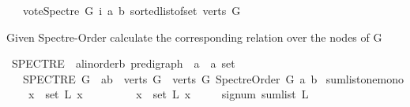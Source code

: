 \begin{isabellebody}
\ \ \ {\isacharparenleft}{\kern0pt}vote{\isacharunderscore}{\kern0pt}Spectre\ G\ i\ a\ b{\isacharparenright}{\kern0pt}{\isacharparenright}{\kern0pt}\ {\isacharparenleft}{\kern0pt}sorted{\isacharunderscore}{\kern0pt}list{\isacharunderscore}{\kern0pt}of{\isacharunderscore}{\kern0pt}set\ {\isacharparenleft}{\kern0pt}verts\ G{\isacharparenright}{\kern0pt}{\isacharparenright}{\kern0pt}{\isacharparenright}{\kern0pt}{\isacharparenright}{\kern0pt}{\isacharparenright}{\kern0pt}\ {\isacharequal}{\kern0pt}\ {}{\isacharparenright}{\kern0pt}{\isachardoublequoteclose}%
\begin{isamarkuptext}%
Given Spectre-Order calculate the corresponding relation over the nodes of G%
\end{isamarkuptext}\isamarkuptrue%
\isamarkupfalse%
\ SPECTRE\ {\isacharcolon}{\kern0pt}{\isacharcolon}{\kern0pt}\ {\isachardoublequoteopen}{\isacharparenleft}{\kern0pt}{\isacharprime}{\kern0pt}a{\isacharcolon}{\kern0pt}{\isacharcolon}{\kern0pt}linorder{\isacharcomma}{\kern0pt}{\isacharprime}{\kern0pt}b{\isacharparenright}{\kern0pt}\ pre{\isacharunderscore}{\kern0pt}digraph\ {\isasymRightarrow}\ {\isacharparenleft}{\kern0pt}{\isacharprime}{\kern0pt}a\ {\isasymtimes}\ {\isacharprime}{\kern0pt}a{\isacharparenright}{\kern0pt}\ set{\isachardoublequoteclose}\isanewline
\ \ \ {\isachardoublequoteopen}SPECTRE\ G\ {\isasymequiv}\ {\isacharbraceleft}{\kern0pt}{\isacharparenleft}{\kern0pt}a{\isacharcomma}{\kern0pt}b{\isacharparenright}{\kern0pt}\ {\isasymin}\ {\isacharparenleft}{\kern0pt}verts\ G\ {\isasymtimes}\ verts\ G{\isacharparenright}{\kern0pt}{\isachardot}{\kern0pt}\ Spectre{\isacharunderscore}{\kern0pt}Order\ G\ a\ b{\isacharbraceright}{\kern0pt}{\isachardoublequoteclose}%
\isadelimdocument
%
\endisadelimdocument
%
\isatagdocument
%
\isamarkuptrue%
%
\endisatagdocument
{\isafolddocument}%
%
\isadelimdocument
%
\endisadelimdocument
{}\isamarkupfalse%
\ sumlist{\isacharunderscore}{\kern0pt}one{\isacharunderscore}{\kern0pt}mono{\isacharcolon}{\kern0pt}\isanewline
\ \ \ {\isachardoublequoteopen}{\isasymforall}\ x\ {\isasymin}\ set\ L{\isachardot}{\kern0pt}\ x\ {\isasymge}\ {}\ {\isachardoublequoteclose}\isanewline
\ \ \ \ \ {\isachardoublequoteopen}{\isasymexists}\ x\ {\isasymin}\ set\ L{\isachardot}{\kern0pt}\ x\ {\isachargreater}{\kern0pt}\ {}{\isachardoublequoteclose}\isanewline
\ \ \ {\isachardoublequoteopen}signum\ {\isacharparenleft}{\kern0pt}sum{\isacharunderscore}{\kern0pt}list\ L{\isacharparenright}{\kern0pt}\ {\isacharequal}{\kern0pt}\ {}{\isachardoublequoteclose}\isanewline

\end{isabellebody}
